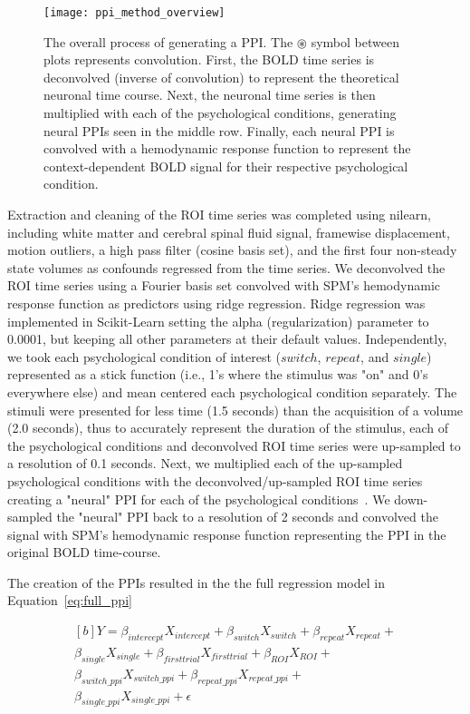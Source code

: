 \documentclass[phd,appendix,figures]{uithesis}
\begin{document}
\begin{figure}[H]
  \centering
  \texttt{[image: ppi\_method\_overview]}
  \caption[Example computation of several PPIs]{
    The overall process of generating a PPI.
    The $\circledast$ symbol between plots represents convolution.
    First, the BOLD time series is deconvolved (inverse of convolution)
    to represent the theoretical neuronal time course.
    Next, the neuronal time series is then multiplied with each of the psychological
    conditions, generating neural PPIs seen in the middle row.
    Finally, each neural PPI is convolved with a hemodynamic response function
    to represent the context-dependent BOLD signal for their respective psychological
    condition.
  }
  \label{fig:ppi_method_overview}
\end{figure}

Extraction and cleaning of the ROI time series was completed using nilearn,
including white matter and cerebral spinal fluid signal, framewise displacement,
motion outliers, a high pass filter (cosine basis set), and the first four non-steady state
volumes as confounds regressed from the time series.
We deconvolved the ROI time series using a Fourier basis set convolved with
SPM's hemodynamic response function as predictors using ridge regression.
Ridge regression was implemented in Scikit-Learn setting the alpha (regularization)
parameter to 0.0001, but keeping all other parameters at their default values.
Independently, we took each psychological condition of interest ($switch$, $repeat$, and $single$)
represented as a stick function (i.e., 1's where the stimulus was "on" and 0's everywhere else)
and mean centered each psychological condition separately.
The stimuli were presented for less time (1.5 seconds) than the acquisition of
a volume (2.0 seconds), thus to accurately represent the duration
of the stimulus, each of the psychological conditions and deconvolved ROI time series were up-sampled to
a resolution of 0.1 seconds.
Next, we multiplied each of the up-sampled psychological conditions with the deconvolved/up-sampled
ROI time series creating a "neural" PPI for each of the
psychological conditions~\cite{McLaren2012}.
We down-sampled the "neural" PPI back to a resolution of 2 seconds and convolved the signal with
SPM's hemodynamic response function representing the PPI in the original BOLD time-course.

The creation of the PPIs resulted in the the full regression model in Equation~\ref{eq:full_ppi}

\begin{equation}
	\begin{multlined}[b]
    Y = \beta_{intercept}X_{intercept} + \beta_{switch}X_{switch} + \beta_{repeat}X_{repeat} + \\
	      \beta_{single}X_{single} + \beta_{firsttrial}X_{firsttrial} + \beta_{ROI}X_{ROI} + \\
		\beta_{switch\_ppi}X_{switch\_ppi} + \beta_{repeat\_ppi}X_{repeat\_ppi} + \\
		\beta_{single\_ppi} X_{single\_ppi} + \epsilon
  \end{multlined}
  \label{eq:full_ppi}
\end{equation}
\end{document}
